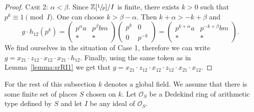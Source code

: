 \begin{proof}
\textsc{Case 2:} $\alpha<\beta$. 
Since $\mathbb{Z}[\sfrac{1}{p}]/I$ is finite, there exists $k>0$ such that $p^k\equiv 1\pmod I$.
One can choose $k>\beta-\alpha$.
Then $k+\alpha>-k+\beta$ and
\[ g\cdot h_{12}\left(p^k\right) =
\begin{pmatrix} p^\alpha a & p^\beta bm \\ * & * \end{pmatrix}
\begin{pmatrix} p^k & 0 \\ 0 & p^{-k} \end{pmatrix}=
\begin{pmatrix} p^{k+\alpha} a & p^{-k+\beta} bm \\ * & * \end{pmatrix}. \]
We find ourselves in the situation of Case 1, therefore we can write $g=x_{21} \cdot z_{12} \cdot x_{12} \cdot x_{21} \cdot h_{12}$.
Finally, using the same token as in Lemma~\ref{lemma:srRI1} we get that $g=x_{21} \cdot z_{12} \cdot x_{12} \cdot z_{12} \cdot x_{21} \cdot x_{12}$.
\end{proof}

For the rest of this subsection $k$ denotes a global field. We assume that there is some finite set of places $S$ chosen on $k$. 
Let $\mathcal{O}_S$ be a Dedekind ring of arithmetic type defined by $S$ and let $I$ be any ideal of $\mathcal{O}_S$.

